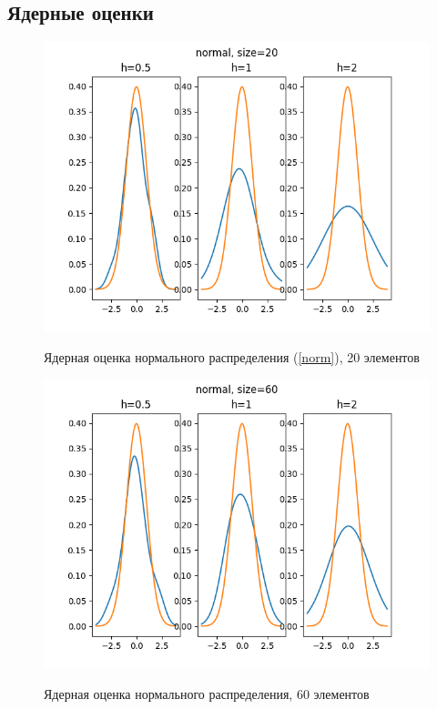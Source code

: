 \documentclass[12pt,a4paper]{article}
\begin{document}
		\subsection{Ядерные оценки}
			\begin{figure}[htp]
				{\includegraphics[width=1\linewidth]{../plots/normal_20.png}}
				\caption{Ядерная оценка нормального распределения (\ref{norm}), 20 элементов}
			\end{figure}
			\begin{figure}
				{\includegraphics[width=1\linewidth]{../plots/normal_60.png}}
				\caption{Ядерная оценка нормального распределения, 60 элементов}
			\end{figure}
			\newpage
			
\end{document}
